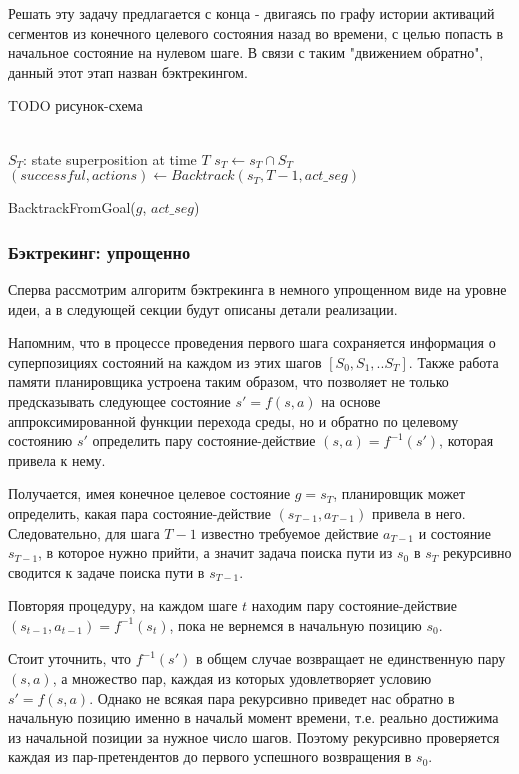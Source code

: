 \documentclass[a4paper]{article}
\begin{document}
Решать эту задачу предлагается с конца - двигаясь по графу истории активаций сегментов из конечного целевого состояния назад во времени, с целью попасть в начальное состояние на нулевом шаге. В связи с таким "движением обратно", данный этот этап назван бэктрекингом.

TODO рисунок-схема

\begin{function}
  \SetAlgoNoLine
  \quad \\

  $S_T$: state superposition at time $T$ \;
  $s_T \leftarrow s_T \cap S_T$ \;
  $(successful, actions) \leftarrow Backtrack(s_T, T-1, act\_seg)$ \;
  \caption{BacktrackFromGoal($g$, $act\_seg$)}
\end{function}

\subsubsection{Бэктрекинг: упрощенно}

Сперва рассмотрим алгоритм бэктрекинга в немного упрощенном виде на уровне идеи, а в следующей секции будут описаны детали реализации.

Напомним, что в процессе проведения первого шага сохраняется информация о суперпозициях состояний на каждом из этих шагов $[S_0, S_1, .. S_T]$. Также работа памяти планировщика устроена таким образом, что позволяет не только предсказывать следующее состояние $s' = f(s, a)$ на основе аппроксимированной функции перехода среды, но и обратно по целевому состоянию $s'$ определить пару состояние-действие $(s, a) = f^{-1}(s')$, которая привела к нему.

Получается, имея конечное целевое состояние $g = s_T$, планировщик может определить, какая пара состояние-действие $(s_{T-1}, a_{T-1})$ привела в него. Следовательно, для шага $T-1$ известно требуемое действие $a_{T-1}$ и состояние $s_{T-1}$, в которое нужно прийти, а значит задача поиска пути из $s_0$ в $s_T$ рекурсивно сводится к задаче поиска пути в $s_{T-1}$.

Повторяя процедуру, на каждом шаге $t$ находим пару состояние-действие $(s_{t-1}, a_{t-1}) = f^{-1}(s_t)$, пока не вернемся в начальную позицию $s_0$.

Стоит уточнить, что $f^{-1}(s')$ в общем случае возвращает не единственную пару $(s, a)$, а множество пар, каждая из которых удовлетворяет условию $s' = f(s, a)$. Однако не всякая пара рекурсивно приведет нас обратно в начальную позицию именно в начальй момент времени, т.е. реально достижима из начальной позиции за нужное число шагов. Поэтому рекурсивно проверяется каждая из пар-претендентов до первого успешного возвращения в $s_0$.
\end{document}

